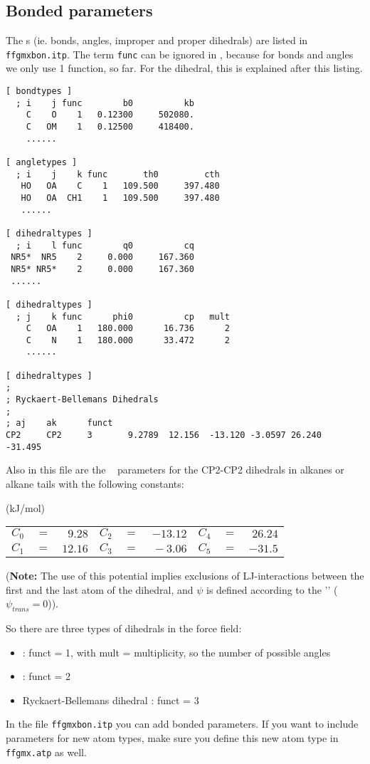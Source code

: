 \subsection{Bonded parameters}
\label{subsec:bondparam}
The s (ie. bonds, angles, improper and proper
dihedrals) are listed in \verb'ffgmxbon.itp'. The term {\tt func} can
be ignored in {\gromacs} {\gmxver}, because for bonds and angles we only use 1
function, so far. For the dihedral, this is explained after this listing.
{\small\begin{verbatim}
[ bondtypes ]
  ; i    j func        b0          kb
    C    O    1   0.12300     502080.
    C   OM    1   0.12500     418400.
    ......

[ angletypes ]
  ; i    j    k func       th0         cth
   HO   OA    C    1   109.500     397.480
   HO   OA  CH1    1   109.500     397.480
   ......

[ dihedraltypes ]
  ; i    l func        q0          cq
 NR5*  NR5    2     0.000     167.360
 NR5* NR5*    2     0.000     167.360
 ......

[ dihedraltypes ]
  ; j    k func      phi0          cp   mult
    C   OA    1   180.000      16.736      2
    C    N    1   180.000      33.472      2
    ......

[ dihedraltypes ]
;
; Ryckaert-Bellemans Dihedrals
;
; aj    ak      funct
CP2     CP2     3       9.2789  12.156  -13.120 -3.0597 26.240  -31.495
\end{verbatim}}
Also in this file are the ~\cite{Ryckaert78} 
parameters for
the CP2-CP2 dihedrals in alkanes or alkane tails with the following
constants:

\begin{center}
(kJ/mol)\\
\begin{tabular}{llrllrllr}
$C_0$ & $=$ & $~ 9.28$ & $C_2$ & $=$ & $-13.12$ & $C_4$ & $=$ & $ 26.24$ \\
$C_1$ & $=$ & $ 12.16$ & $C_3$ & $=$ & $~-3.06$ & $C_5$ & $=$ & $-31.5 $ \\
\end{tabular}
\end{center}

({\bf Note:} The use of this potential implies exclusions of LJ-interactions
between the first and the last atom of the dihedral, and $\psi$ is defined
according to the '' ($\psi_{trans}=0$)).

So there are three types of dihedrals in the {\gromacs} force field:
\begin{itemize}
\item {} : funct = 1, with mult = multiplicity, so the
                                   number of possible angles
\item {} : funct = 2
\item Ryckaert-Bellemans dihedral : funct = 3
\end{itemize}
In the file \verb'ffgmxbon.itp' you can add bonded parameters. If you
want to include parameters for new atom types, make sure you define
this new atom type in \verb'ffgmx.atp' as well.

